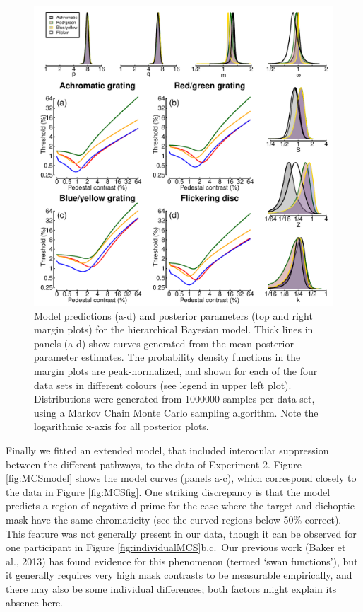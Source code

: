 \documentclass[
]{article}
\begin{document}
\begin{figure}

{\centering \includegraphics{Figures/stanoutput} 

}

\caption{Model predictions (a-d) and posterior parameters (top and right margin plots) for the hierarchical Bayesian model. Thick lines in panels (a-d) show curves generated from the mean posterior parameter estimates. The probability density functions in the margin plots are peak-normalized, and shown for each of the four data sets in different colours (see legend in upper left plot). Distributions were generated from 1000000 samples per data set, using a Markov Chain Monte Carlo sampling algorithm. Note the logarithmic x-axis for all posterior plots.}\label{fig:bayesianmodel}
\end{figure}

Finally we fitted an extended model, that included interocular suppression between the different pathways, to the data of Experiment 2. Figure \ref{fig:MCSmodel} shows the model curves (panels a-c), which correspond closely to the data in Figure \ref{fig:MCSfig}. One striking discrepancy is that the model predicts a region of negative d-prime for the case where the target and dichoptic mask have the same chromaticity (see the curved regions below 50\% correct). This feature was not generally present in our data, though it can be observed for one participant in Figure \ref{fig:individualMCS}b,c.~Our previous work (Baker et al., 2013) has found evidence for this phenomenon (termed `swan functions'), but it generally requires very high mask contrasts to be measurable empirically, and there may also be some individual differences; both factors might explain its absence here.
\end{document}
